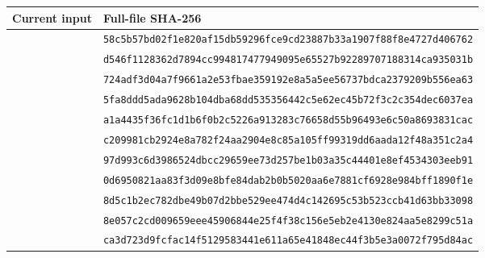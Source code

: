 \documentclass[11pt]{article}
\begin{document}
\begin{longtable}{L{0.44\textwidth}L{0.50\textwidth}}
\toprule Current input & Full-file SHA-256\\\midrule\endhead
\small{} & \small\texttt{58c5b57bd02f1e820af15db59296fce9}\newline\texttt{cd23887b33a1907f88f8e4727d406762}\\
\small{} & \small\texttt{d546f1128362d7894cc9948174779490}\newline\texttt{95e65527b92289707188314ca935031b}\\
\small{} & \small\texttt{724adf3d04a7f9661a2e53fbae359192}\newline\texttt{e8a5a5ee56737bdca2379209b556ea63}\\
\small{} & \small\texttt{5fa8ddd5ada9628b104dba68dd535356}\newline\texttt{442c5e62ec45b72f3c2c354dec6037ea}\\
\small{} & \small\texttt{a1a4435f36fc1d1b6f0b2c5226a91328}\newline\texttt{3c76658d55b96493e6c50a8693831cac}\\
\small{} & \small\texttt{c209981cb2924e8a782f24aa2904e8c8}\newline\texttt{5a105ff99319dd6aada12f48a351c2a4}\\
\small{} & \small\texttt{97d993c6d3986524dbcc29659ee73d25}\newline\texttt{7be1b03a35c44401e8ef4534303eeb91}\\
\small{} & \small\texttt{0d6950821aa83f3d09e8bfe84dab2b0b}\newline\texttt{5020aa6e7881cf6928e984bff1890f1e}\\
\small{} & \small\texttt{8d5c1b2ec782dbe49b07d2bbe529ee47}\newline\texttt{4d4c142695c53b523ccb41d63bb33098}\\
\small{} & \small\texttt{8e057c2cd009659eee45906844e25f4f}\newline\texttt{38c156e5eb2e4130e824aa5e8299c51a}\\
\small{} & \small\texttt{ca3d723d9fcfac14f5129583441e611a}\newline\texttt{65e41848ec44f3b5e3a0072f795d84ac}\\

\end{longtable}
\end{document}
